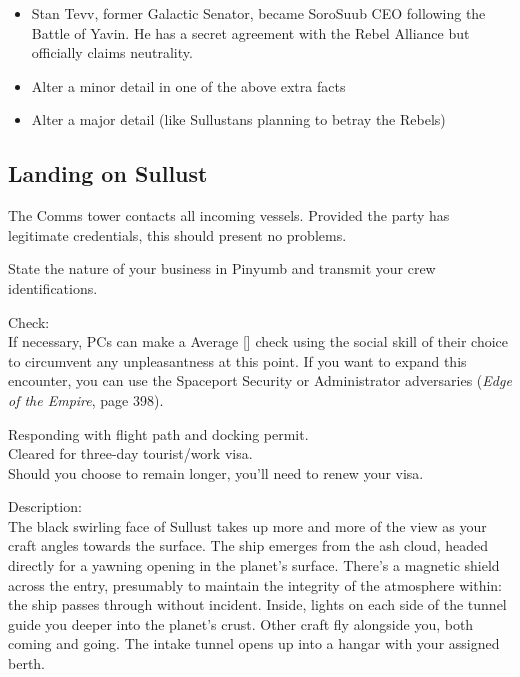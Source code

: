 \documentclass{book}
\newcommand{\df}{\difficulty}
\begin{document}
\begin{multicols*}{2}
\begin{itemize}
    \item \triumph Stan Tevv, former Galactic Senator, became SoroSuub CEO following the Battle of Yavin.  He has a secret agreement with the Rebel Alliance but officially claims neutrality.
    \item \threat Alter a minor detail in one of the above extra facts
    \item \despair Alter a major detail (like Sullustans planning to betray the Rebels)
\end{itemize}

    \subsection{Landing on Sullust}
The Comms tower contacts all incoming vessels.  Provided the party has legitimate credentials, this should present no problems.

\begin{quoting}
State the nature of your business in Pinyumb and transmit your crew identifications.
\end{quoting}
Check:\\
If necessary, PCs can make a Average [\df\df] check using the social skill of their choice to circumvent any unpleasantness at this point.  If you want to expand this encounter, you can use the Spaceport Security or Administrator adversaries (\emph{Edge of the Empire}, page 398).
\begin{quoting}
Responding with flight path and docking permit.\\
Cleared for three-day tourist/work visa.\\
Should you choose to remain longer, you’ll need to renew your visa.
\end{quoting}
Description:\\
The black swirling face of Sullust takes up more and more of the view as your craft angles towards the surface. The ship emerges from the ash cloud, headed directly for a yawning opening in the planet’s surface. There’s a magnetic shield across the entry, presumably to maintain the integrity of the atmosphere within: the ship passes through without incident. Inside, lights on each side of the tunnel guide you deeper into the planet’s crust. Other craft fly alongside you, both coming and going. The intake tunnel opens up into a hangar with your assigned berth.


\end{multicols*}
\end{document}
